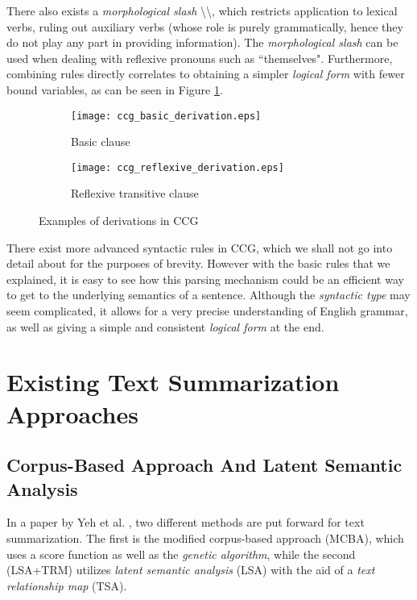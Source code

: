 \mbox{}

There also exists a \textit{morphological slash} \textbackslash\textbackslash, which restricts application to lexical verbs, ruling out auxiliary verbs (whose role is purely grammatically, hence they do not play any part in providing information). The \textit{morphological slash} can be used when dealing with reflexive pronouns such as ``themselves". Furthermore, combining rules directly correlates to obtaining a simpler \textit{logical form} with fewer bound variables, as can be seen in Figure \ref{fig:ccg_derivations}.

\begin{figure}[H]
\centering
\begin{subfigure}{0.3\textwidth}
\centering
\texttt{[image: ccg\_basic\_derivation.eps]}
\caption{\cite{steedman_combinatory_nodate} Basic clause}
\end{subfigure}
\begin{subfigure}{0.6\textwidth}
\centering
\texttt{[image: ccg\_reflexive\_derivation.eps]}
\caption{\cite{steedman_combinatory_nodate} Reflexive transitive clause}
\end{subfigure}
\caption{Examples of derivations in CCG}
\label{fig:ccg_derivations}
\end{figure}

There exist more advanced syntactic rules in CCG, which we shall not go into detail about for the purposes of brevity. However with the basic rules that we explained, it is easy to see how this parsing mechanism could be an efficient way to get to the underlying semantics of a sentence. Although the \textit{syntactic type} may seem complicated, it allows for a very precise understanding of English grammar, as well as giving a simple and consistent \textit{logical form} at the end.

\section{Existing Text Summarization Approaches}

\subsection{Corpus-Based Approach And Latent Semantic Analysis}
\label{subsec:mcba_lsa_trm}

In a paper by Yeh et al. \cite{yeh_text_2005}, two different methods are put forward for text summarization. The first is the modified corpus-based approach (MCBA), which uses a score function as well as the \textit{genetic algorithm}, while the second (LSA+TRM) utilizes \textit{latent semantic analysis} (LSA) with the aid of a \textit{text relationship map} (TSA).

